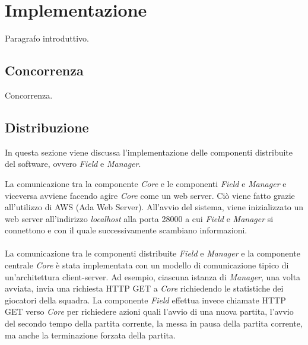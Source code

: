 
\section*{Implementazione}
%
\label{sec:implementazione}

Paragrafo introduttivo.

\subsection*{Concorrenza}
%
\label{sec:implemetazione_concorrenza}

Concorrenza.

\subsection*{Distribuzione}
%
\label{sec:implementazione_distribuzione}

In questa sezione viene discussa l'implementazione delle componenti distribuite del software, ovvero \emph{Field} e \emph{Manager}.

La comunicazione tra la componente \emph{Core} e le componenti \emph{Field} e \emph{Manager} e viceversa avviene facendo agire \emph{Core} come un web server. Ci\`{o} viene fatto grazie all'utilizzo di AWS (Ada Web Server). All'avvio del sistema, viene inizializzato un web server all'indirizzo \emph{localhost} alla porta 28000 a cui \emph{Field} e \emph{Manager} si connettono e con il quale successivamente scambiano informazioni.\\\\ 
La comunicazione tra le componenti distribuite \emph{Field} e \emph{Manager} e la componente centrale \emph{Core} \`{e} stata implementata con un modello di comunicazione tipico di un’architettura client-server. Ad esempio, ciascuna istanza di \emph{Manager}, una volta avviata, invia una richiesta HTTP GET a \emph{Core} richiedendo le statistiche dei giocatori della squadra. La componente \emph{Field} effettua invece chiamate  HTTP GET verso \emph{Core} per richiedere azioni quali l'avvio di una nuova partita, l'avvio del secondo tempo della partita corrente, la messa in pausa della partita corrente, ma anche la terminazione forzata della partita.

